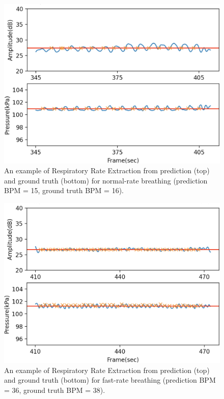 \documentclass[10pt,letterpaper]{article}
\begin{document}
		\begin{figure}[htbp]
			\centerline{\includegraphics[width=120mm,scale=0.9]{PD2GT_NORMAL02.png}}
			\caption{An example of Respiratory Rate Extraction from prediction (top) and ground truth (bottom) for normal-rate breathing (prediction BPM = 15, ground truth BPM = 16).}
			\label{fig:RREXT_NORMAL}
		\end{figure}
	\begin{figure}[htbp]
		\centerline{\includegraphics[width=120mm,scale=0.9]{PD2GT_FAST02.png}}
		\caption{An example of Respiratory Rate Extraction from prediction (top) and ground truth (bottom) for fast-rate breathing (prediction BPM = 36, ground truth BPM = 38).}
		\label{fig:RREXT_FAST}
	\end{figure}
\end{document}
